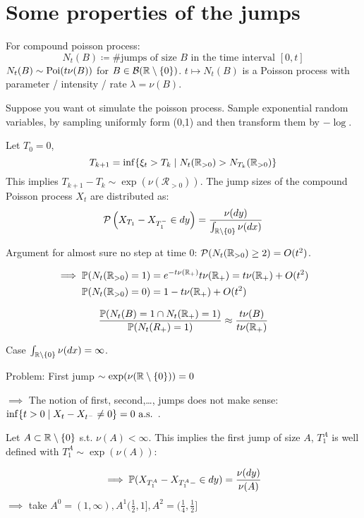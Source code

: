 \section{Some properties of the jumps}

For compound poisson process:
\[N_t(B)\coloneqq \text{\# jumps of size }B \text{ in the time interval }[0,t]\]
$N_t(B)\sim\text{Poi}(t\nu(B))$ for $B\in \mathcal{B}(\mathbb{R}\setminus\{0\})$. $t\mapsto N_t(B)$ is a Poisson process
with parameter / intensity / rate $\lambda=\nu(B)$.

\begin{aremark}
    Suppose you want ot simulate the poisson process. Sample exponential random variables, by sampling uniformly form (0,1) and then transform them by $-\log$.
\end{aremark}

Let $T_0=0$, \[T_{k+1}=\inf\{\xi_t>T_k\mid N_t(\mathbb{R}_{>0})>N_{T_k}(\mathbb{R}_{>0})\}\]
This implies $T_{k+1}-T_k\sim\exp(\nu(\mathcal{R_{>0}}))$. The jump sizes of the 
compound Poisson process $X_t$ are distributed as:
\[\mathcal{P}\left(X_{T_1}-X_{T_1^-}\in dy\right)=\frac{\nu(dy)}{\int_{\mathbb{R}\setminus\{0\}} \nu(dx)}\]

Argument for almost sure no step at time $0$: $\mathcal{P}(N_t(\mathbb{R}_{>0})\geq 2)=O(t^2)$.

\begin{align*}
    \implies \mathbb{P}(N_t(\mathbb{R}_{>0})=1)&=e^{-t\nu(\mathbb{R}_+)}t\nu(\mathbb{R}_+)=t\nu(\mathbb{R}_+)+O(t^2)\\
    \mathbb{P}(N_t(\mathbb{R}_{>0})=0)&=1-t\nu(\mathbb{R}_+)+O(t^2)
\end{align*}

\begin{align*}
    \frac{\mathbb{P}(N_t(B)=1\cap N_t(\mathbb{R}_+)=1)}{\mathbb{P}(N_t(R_+)=1)}\approx\frac{t\nu(B)}{t\nu(\mathbb{R}_+)}
\end{align*}

Case $\int_{\mathbb{R}\setminus \{0\}}\nu(dx)=\infty$.

Problem: First jump $\sim\exp(\nu(\mathbb{R}\setminus\{0\}))=0$

$\implies$ The notion of first, second,\dots, jumps does not make sense: $\inf\{t>0\mid X_t-X_{t^-}\neq 0\}=0\text{ a.s. }$.

Let $A\subset\mathbb{R}\setminus\{0\}$ s.t. $\nu(A)<\infty$. This implies the first jump of size $A$, $T_1^A$ is well defined with 
$T_1^A \sim\exp(\nu(A))$:

\[\implies \mathbb{P}(X_{T_1^A}-X_{T_1^A-}\in dy)=\frac{\nu(dy)}{\nu(A)}\]
$\implies$ take $A^0=(1,\infty),A^1(\frac{1}{2},1], A^2=(\frac{1}{4},\frac{1}{2}]$

